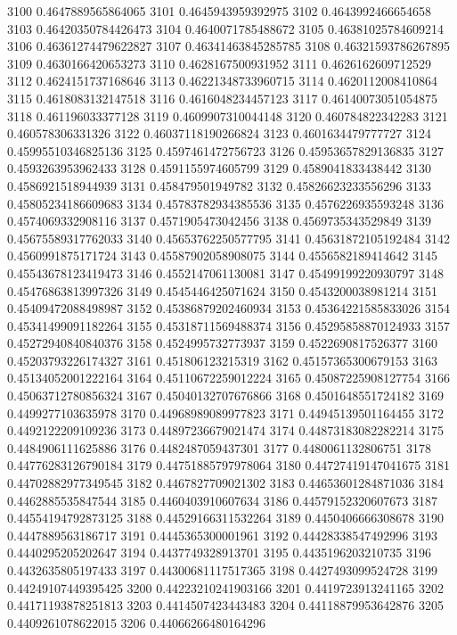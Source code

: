 3100 0.4647889565864065
3101 0.4645943959392975
3102 0.4643992466654658
3103 0.46420350784426473
3104 0.4640071785488672
3105 0.46381025784609214
3106 0.46361274479622827
3107 0.46341463845285785
3108 0.46321593786267895
3109 0.4630166420653273
3110 0.4628167500931952
3111 0.4626162609712529
3112 0.4624151737168646
3113 0.46221348733960715
3114 0.4620112008410864
3115 0.4618083132147518
3116 0.4616048234457123
3117 0.46140073051054875
3118 0.461196033377128
3119 0.4609907310044148
3120 0.460784822342283
3121 0.460578306331326
3122 0.46037118190266824
3123 0.4601634479777727
3124 0.45995510346825136
3125 0.4597461472756723
3126 0.45953657829136835
3127 0.4593263953962433
3128 0.4591155974605799
3129 0.4589041833438442
3130 0.4586921518944939
3131 0.458479501949782
3132 0.45826623233556296
3133 0.45805234186609683
3134 0.45783782934385536
3135 0.4576226935593248
3136 0.4574069332908116
3137 0.4571905473042456
3138 0.4569735343529849
3139 0.45675589317762033
3140 0.45653762250577795
3141 0.45631872105192484
3142 0.4560991875171724
3143 0.45587902058908075
3144 0.4556582189414642
3145 0.45543678123419473
3146 0.4552147061130081
3147 0.45499199220930797
3148 0.45476863813997326
3149 0.4545446425071624
3150 0.4543200038981214
3151 0.45409472088498987
3152 0.45386879202460934
3153 0.45364221585833026
3154 0.45341499091182264
3155 0.45318711569488374
3156 0.45295858870124933
3157 0.45272940840840376
3158 0.4524995732773937
3159 0.4522690817526377
3160 0.45203793226174327
3161 0.451806123215319
3162 0.45157365300679153
3163 0.45134052001222164
3164 0.45110672259012224
3165 0.45087225908127754
3166 0.45063712780856324
3167 0.45040132707676866
3168 0.4501648551724182
3169 0.4499277103635978
3170 0.44968989089977823
3171 0.44945139501164455
3172 0.4492122209109236
3173 0.44897236679021474
3174 0.44873183082282214
3175 0.4484906111625886
3176 0.4482487059437301
3177 0.4480061132806751
3178 0.44776283126790184
3179 0.44751885797978064
3180 0.44727419147041675
3181 0.44702882977349545
3182 0.4467827709021302
3183 0.44653601284871036
3184 0.4462885535847544
3185 0.4460403910607634
3186 0.44579152320607673
3187 0.44554194792873125
3188 0.44529166311532264
3189 0.4450406666308678
3190 0.4447889563186717
3191 0.4445365300001961
3192 0.44428338547492996
3193 0.4440295205202647
3194 0.4437749328913701
3195 0.4435196203210735
3196 0.4432635805197433
3197 0.44300681117517365
3198 0.4427493099524728
3199 0.44249107449395425
3200 0.44223210241903166
3201 0.4419723913241165
3202 0.44171193878251813
3203 0.4414507423443483
3204 0.44118879953642876
3205 0.4409261078622015
3206 0.44066266480164296
